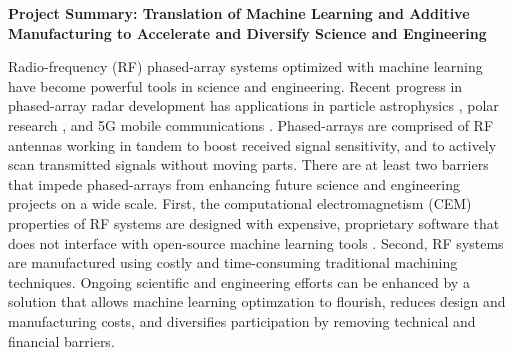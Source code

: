 \documentclass[../../main.tex]{subfiles}
\begin{document}
\textbf{Project Summary: Translation of Machine Learning and Additive Manufacturing to Accelerate and Diversify Science and Engineering} \\ \vspace{2.5mm}

Radio-frequency (RF) phased-array systems optimized with machine learning have become powerful tools in science and engineering.  Recent progress in phased-array radar development has applications in particle astrophysics \cite{Vieregg_2016,AVVA201746,electronics10040415,Aguilar_2021}, polar research \cite{arnold_2020,9670670}, and 5G mobile communications \cite{5G_review_paper}.  Phased-arrays are comprised of RF antennas working in tandem to boost received signal sensitivity, and to actively scan transmitted signals without moving parts.  There are at least two barriers that impede phased-arrays from enhancing future science and engineering projects on a wide scale.  First, the computational electromagnetism (CEM) properties of RF systems are designed with expensive, proprietary software that does not interface with open-source machine learning tools \cite{10.3390/electronics8121506}.  Second, RF systems are manufactured using costly and time-consuming traditional machining techniques.  Ongoing scientific and engineering efforts can be enhanced by a solution that allows machine learning optimzation to flourish, reduces design and manufacturing costs, and diversifies participation by removing technical and financial barriers. \\ \vspace{2.5mm}
\end{document}
